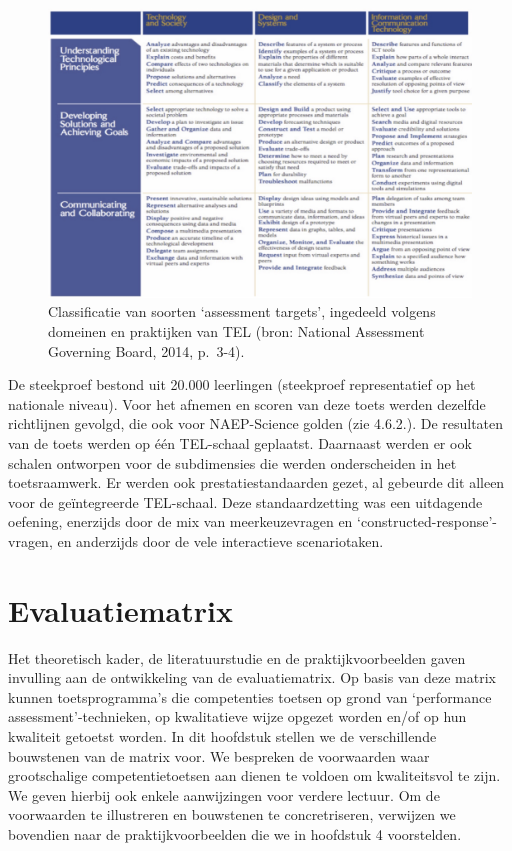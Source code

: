 \documentclass[
  letterpaper,
]{report}
\begin{document}
\begin{figure}

{\centering \includegraphics{./FIG9.jpg}

}

\caption{\label{fig-figuur9}Classificatie van soorten `assessment
targets', ingedeeld volgens domeinen en praktijken van TEL (bron:
National Assessment Governing Board, 2014, p.~3-4).}

\end{figure}

De steekproef bestond uit 20.000 leerlingen (steekproef representatief
op het nationale niveau). Voor het afnemen en scoren van deze toets
werden dezelfde richtlijnen gevolgd, die ook voor NAEP-Science golden
(zie 4.6.2.). De resultaten van de toets werden op één TEL-schaal
geplaatst. Daarnaast werden er ook schalen ontworpen voor de
subdimensies die werden onderscheiden in het toetsraamwerk. Er werden
ook prestatiestandaarden gezet, al gebeurde dit alleen voor de
geïntegreerde TEL-schaal. Deze standaardzetting was een uitdagende
oefening, enerzijds door de mix van meerkeuzevragen en
`constructed-response'-vragen, en anderzijds door de vele interactieve
scenariotaken.

\hypertarget{evaluatiematrix}{%
\chapter{Evaluatiematrix}\label{evaluatiematrix}}

Het theoretisch kader, de literatuurstudie en de praktijkvoorbeelden
gaven invulling aan de ontwikkeling van de evaluatiematrix. Op basis van
deze matrix kunnen toetsprogramma's die competenties toetsen op grond
van `performance assessment'-technieken, op kwalitatieve wijze opgezet
worden en/of op hun kwaliteit getoetst worden. In dit hoofdstuk stellen
we de verschillende bouwstenen van de matrix voor. We bespreken de
voorwaarden waar grootschalige competentietoetsen aan dienen te voldoen
om kwaliteitsvol te zijn. We geven hierbij ook enkele aanwijzingen voor
verdere lectuur. Om de voorwaarden te illustreren en bouwstenen te
concretriseren, verwijzen we bovendien naar de praktijkvoorbeelden die
we in hoofdstuk 4 voorstelden.
\end{document}

